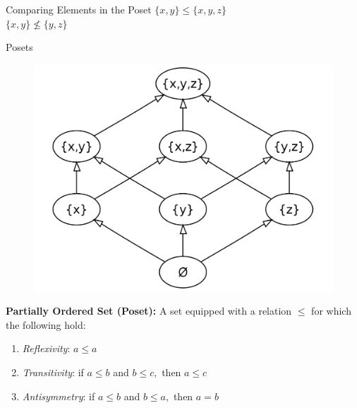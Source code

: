 \documentclass[xcolor=x11names,compress,t]{beamer}
\begin{document}
\begin{frame}{Comparing Elements in the Poset}
    \Huge
    \centering
    \vspace{1cm}
    $\{x,y\} \leq \{x,y,z\}$ \\
    \vspace{1cm}
    $\{x,y\} \nleq \{y,z\}$ 
\end{frame}

\begin{frame}{Posets}
    \begin{figure}[htp]
        \centering
        \includegraphics[scale = 0.14]{poset2.png}
    \end{figure}
    
    \textbf{Partially Ordered Set (Poset):} A set equipped with a relation $\leq$ \pause for which the following hold:
    
    \begin{enumerate}
        \item \emph{Reflexivity}: $a\leq a$
        
        \item \emph{Transitivity}: if $a\leq b$ and $b\leq c,$ then $a\leq c$
        
        \item \emph{Antisymmetry}: if $a\leq b$ and $b\leq a,$ then $a=b$
        
    \end{enumerate}
\end{frame}
\end{document}
